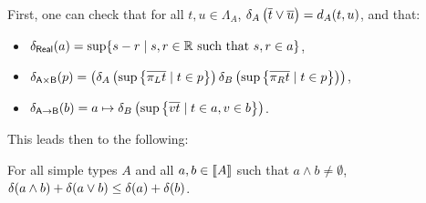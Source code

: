  
 First, one can check that for all $t,u \in \Lambda_A$, $\delta_A\left(\overline{t} \vee \overline{u}\right) = d_A(t,u)$, and that:
 \begin{itemize}
\item
$\delta_\mathsf{Real}(a)   = \sup\{s-r \mid s,r \in \mathbb{R} \text{ such that } s,r \in a\}$,
\item 
$\delta_\mathsf{A \times B}(p)  = \left(\delta_A\left(\sup\left\{\overline{\pi_L t} \mid t \in p\right\}\right)\delta_B\left(\sup\left\{\overline{\pi_R t} \mid t \in p\right\}\right)\right)$,
\item$ \delta_\mathsf{A \to B}(b)  = a \mapsto \delta_B\left(\sup\left\{\overline{vt} \mid t\in a, v \in b\right\}\right)$.
\end{itemize}
This leads then to the following:
\begin{proposition}\label{prop:submodular} For all simple types $A$ and all $a,b \in \llbracket A \rrbracket$ such that $a \wedge b \neq \emptyset$, $\delta(a \wedge b) + \delta(a \vee b) \leq \delta(a) + \delta(b)$.
\end{proposition}
